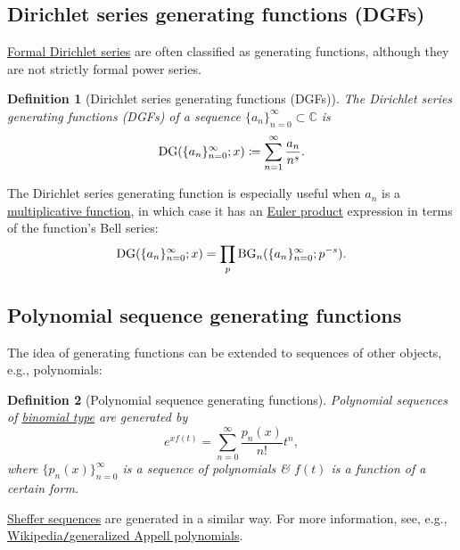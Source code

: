\documentclass[oneside]{book}
\newtheorem{definition}{Definition}
\begin{document}

\subsection{Dirichlet series generating functions (DGFs)}
\href{https://en.wikipedia.org/wiki/Formal_Dirichlet_series}{Formal Dirichlet series} are often classified as generating functions, although they are not strictly formal power series.

\begin{definition}[Dirichlet series generating functions (DGFs)]
	The {\rm Dirichlet series generating functions (DGFs)} of a sequence $\{a_n\}_{n=0}^\infty\subset\mathbb{C}$ is
	\begin{equation*}
		{\rm DG}(\{a_n\}_{n=0}^\infty;x)\coloneqq\sum_{n=1}^\infty \frac{a_n}{n^s}.
	\end{equation*}
\end{definition}
The Dirichlet series generating function is especially useful when $a_n$ is a \href{https://en.wikipedia.org/wiki/Multiplicative_function}{multiplicative function}, in which case it has an \href{https://en.wikipedia.org/wiki/Euler_product}{Euler product} expression in terms of the function's Bell series:
\begin{equation*}
	{\rm DG}(\{a_n\}_{n=0}^\infty;x) = \prod_p {\rm BG}_n(\{a_n\}_{n=0}^\infty;p^{-s}).
\end{equation*}


\subsection{Polynomial sequence generating functions}
The idea of generating functions can be extended to sequences of other objects, e.g., polynomials:

\begin{definition}[Polynomial sequence generating functions]
	{\rm Polynomial sequences} of \href{https://en.wikipedia.org/wiki/Binomial_type}{binomial type} are generated by
		\begin{equation*}
			e^{xf(t)} = \sum_{n=0}^\infty \frac{p_n(x)}{n!}t^n,
		\end{equation*}
		where $\{p_n(x)\}_{n=0}^\infty$ is a sequence of polynomials \& $f(t)$ is a function of a certain form.
\end{definition}
\href{https://en.wikipedia.org/wiki/Sheffer_sequence}{Sheffer sequences} are generated in a similar way. For more information, see, e.g., \href{https://en.wikipedia.org/wiki/Generalized_Appell_polynomials}{Wikipedia{\tt/}generalized Appell polynomials}.
\end{document}
